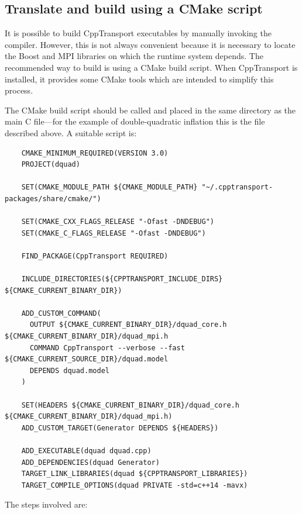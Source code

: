 \documentclass[11pt,a4paper]{article}
\renewcommand{\texttt}[1]{{\ttfamily\fontseries{l}\selectfont{#1}}}
\newcommand{\packagefont}{\sffamily}
\newcommand{\CppTransport}{{\packagefont CppTransport}}
\newcommand{\MPI}{{\packagefont MPI}}
\newcommand{\Boost}{{\packagefont Boost}}
\newcommand{\CMake}{{\packagefont CMake}}
\newcommand{\file}[1]{\texttt{{#1}}}
\newcommand\CC{C\nolinebreak\hspace{-.05em}\raisebox{.4ex}{\relsize{-3}{\textbf{+}}}\nolinebreak\hspace{-.10em}\raisebox{.4ex}{\relsize{-3}{\textbf{+}}}}
\begin{document}
\subsection{Translate and build using a {\CMake} script}
It is possible to build {\CppTransport} executables by manually invoking the
compiler.
However, this
is not always convenient because it is necessary to locate the
{\Boost} and {\MPI}
libraries on which the runtime system depends.
The recommended way to build is using a {\CMake} build script.
When {\CppTransport} is installed, it provides some
{\CMake} tools which are intended to simplify this process.

The {\CMake} build script should be called \file{CMakeLists.txt} and
placed in the same directory as the
main {\CC} file---for the example of double-quadratic
inflation this is the file \file{dquad.mpi}
described above. A suitable script is:
\begin{verbatim}
    CMAKE_MINIMUM_REQUIRED(VERSION 3.0)
    PROJECT(dquad)
    
    SET(CMAKE_MODULE_PATH ${CMAKE_MODULE_PATH} "~/.cpptransport-packages/share/cmake/")
    
    SET(CMAKE_CXX_FLAGS_RELEASE "-Ofast -DNDEBUG")
    SET(CMAKE_C_FLAGS_RELEASE "-Ofast -DNDEBUG")
    
    FIND_PACKAGE(CppTransport REQUIRED)
    
    INCLUDE_DIRECTORIES(${CPPTRANSPORT_INCLUDE_DIRS} ${CMAKE_CURRENT_BINARY_DIR})
    
    ADD_CUSTOM_COMMAND(
      OUTPUT ${CMAKE_CURRENT_BINARY_DIR}/dquad_core.h ${CMAKE_CURRENT_BINARY_DIR}/dquad_mpi.h
      COMMAND CppTransport --verbose --fast ${CMAKE_CURRENT_SOURCE_DIR}/dquad.model
      DEPENDS dquad.model
    )
    
    SET(HEADERS ${CMAKE_CURRENT_BINARY_DIR}/dquad_core.h ${CMAKE_CURRENT_BINARY_DIR}/dquad_mpi.h)
    ADD_CUSTOM_TARGET(Generator DEPENDS ${HEADERS})
    
    ADD_EXECUTABLE(dquad dquad.cpp)
    ADD_DEPENDENCIES(dquad Generator)
    TARGET_LINK_LIBRARIES(dquad ${CPPTRANSPORT_LIBRARIES})
    TARGET_COMPILE_OPTIONS(dquad PRIVATE -std=c++14 -mavx)
\end{verbatim}
The steps involved are:
\end{document}
